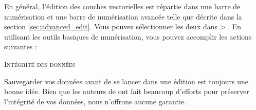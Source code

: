
En général, l'édition des couches vectorielles est répartie dans une barre de 
numérisation et une barre de numérisation avancée telle que décrite dans la 
section \ref{sec:advanced_edit}. Vous pouvez sélectionner les deux dans 
 > . En utilisant les 
outils basiques de numérisation, vous pouvez accomplir les actions suivantes :

\begin{Tip}[ht]\caption{\textsc{Intégrité des données}}
Sauvegarder vos données avant de se lancer dans une édition est toujours une 
bonne idée. Bien que les auteurs de \qg ont fait beaucoup d'efforts pour 
préserver l'intégrité de vos données, nous n'offrons aucune garantie.
\end{Tip}
